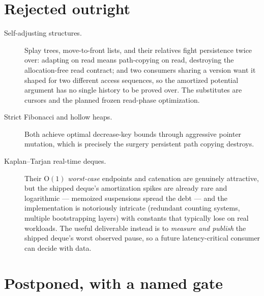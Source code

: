 \documentclass[11pt,twoside,openright]{book}
\newcommand{\bigoh}[1]{$\mathrm{O}(#1)$}
\begin{document}
\section{Rejected outright}

\begin{description}
\item[Self-adjusting structures.] Splay trees, move-to-front lists, and their
relatives fight persistence twice over: adapting on read means path-copying on
read, destroying the allocation-free read contract; and two consumers sharing a
version want it shaped for two different access sequences, so the amortized
potential argument has no single history to be proved over. The substitutes are
cursors and the planned frozen read-phase optimization.

\item[Strict Fibonacci and hollow heaps.] Both achieve optimal decrease-key
bounds through aggressive pointer mutation, which is precisely the surgery
persistent path copying destroys.

\item[Kaplan--Tarjan real-time deques.] Their \bigoh{1} \emph{worst-case}
endpoints and catenation are genuinely attractive, but the shipped deque's
amortization spikes are already rare and logarithmic --- memoized suspensions
spread the debt --- and the implementation is notoriously intricate (redundant
counting systems, multiple bootstrapping layers) with constants that typically
lose on real workloads. The useful deliverable instead is to \emph{measure and
publish} the shipped deque's worst observed pause, so a future latency-critical
consumer can decide with data.
\end{description}

\section{Postponed, with a named gate}
\end{document}
